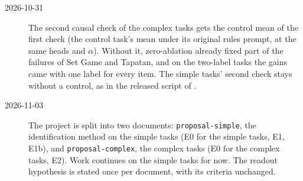 \documentclass[11pt,a4paper]{article}
\begin{document}
\begin{description}
\item[2026-10-31] The second causal check of the complex tasks gets the control mean of the first check (the control task's mean under its original rules prompt, at the same heads and $\alpha$). Without it, zero-ablation already fixed part of the failures of Set Game and Tapatan, and on the two-label tasks the gains came with one label for every item. The simple tasks' second check stays without a control, as in the released script of \citet{yang2026shared}.
\item[2026-11-03] The project is split into two documents: \texttt{proposal-simple}, the identification method on the simple tasks (E0 for the simple tasks, E1, E1b), and \texttt{proposal-complex}, the complex tasks (E0 for the complex tasks, E2). Work continues on the simple tasks for now. The readout hypothesis is stated once per document, with its criteria unchanged.
\end{description}
\end{document}
